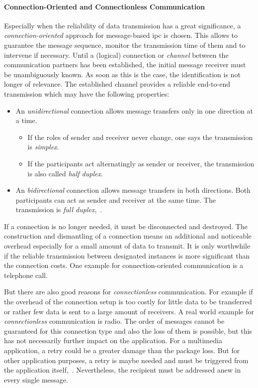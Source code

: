 \paragraph{Connection-Oriented and Connectionless Communication}
Especially when the reliability of data transmission has a great significance, a \textit{connection-oriented} approach for message-based \ac{ipc} is chosen.
This allows to guarantee the message sequence, monitor the transmission time of them and to intervene if necessary\cite{glatz2015betriebssysteme}.
Until a (logical) connection or \textit{channel} between the communication partners has been established, the initial message receiver must be unambiguously known.
As soon as this is the case, the identification is not longer of relevance.
The established channel provides a reliable end-to-end transmission which may have the following properties:
%
\begin{itemize}
    \item An \textit{unidirectional} connection allows message transfers only in one direction at a time. 
        \begin{itemize}
            \item If the roles of sender and receiver never change, one says the transmission is \textit{simplex}.
            \item If the participants act alternatingly as sender or receiver, the transmission is also called \textit{half duplex}.
        \end{itemize}
    \item An \textit{bidirectional} connection allows message transfers in both directions. Both participants can act as sender and receiver at the same time. The transmission is \textit{full duplex}\cite{brause2017betriebssysteme},~\cite{glatz2015betriebssysteme}.
\end{itemize}
%
If a connection is no longer needed, it must be disconnected and destroyed.
The construction and dismantling of a connection means an additional and noticeable overhead especially for a small amount of data to transmit.
It is only worthwhile if the reliable transmission between designated instances is more significant than the connection costs\cite{glatz2015betriebssysteme}.
One example for connection-oriented communication is a telephone call.

But there are also good reasons for \textit{connectionless} communication.
For example if the overhead of the connection setup is too costly for little data to be transferred or rather few data is sent to a large amount of receivers.
A real world example for \textit{connectionless} communication is radio.
The order of messages cannot be guaranteed for this connection type and also the loss of them is possible, but this has not necessarily further impact on the application.
For a multimedia application, a retry could be a greater damage than the package loss.
But for other application purposes, a retry is maybe needed and must be triggered from the application itself\cite{glatz2015betriebssysteme},~\cite{brause2017betriebssysteme}.
Nevertheless, the recipient must be addressed anew in every single message.

